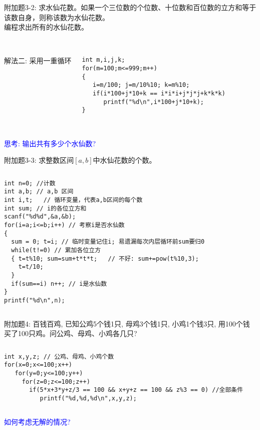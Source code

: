 \begin{frame}[fragile]
附加题3-2: 求水仙花数。如果一个三位数的个位数、十位数和百位数的立方和等于该数自身，则称该数为水仙花数。 \\
编程求出所有的水仙花数。\\
~\\ 
\pause
\begin{columns}
解法二: 采用一重循环
\begin{lstlisting}
int m,i,j,k; 
for(m=100;m<=999;m++)
{
   i=m/100; j=m/10%10; k=m%10;  
   if(i*100+j*10+k == i*i*i+j*j*j+k*k*k)  
      printf("%d\n",i*100+j*10+k);
}
\end{lstlisting}
\end{columns}
~\\
\textcolor{blue}{思考: 输出共有多少个水仙数?}
\end{frame}

\begin{frame}[fragile]
附加题3-3: 求整数区间$[a,b]$中水仙花数的个数。
\pause
\begin{columns}
\begin{lstlisting}
int n=0; //计数 
int a,b; // a,b 区间
int i,t;   // 循环变量，代表a,b区间的每个数
int sum; // i的各位立方和 
scanf("%d%d",&a,&b);
for(i=a;i<=b;i++) // 考察i是否水仙数
{  
  sum = 0; t=i; // 临时变量记住i; 易遗漏每次内层循环前sum要归0
  while(t!=0) // 累加各位立方 
  { t=t%10; sum=sum+t*t*t;   // 不好: sum+=pow(t%10,3);
    t=t/10; 
  }
  if(sum==i) n++; // i是水仙数 
}
printf("%d\n",n);
\end{lstlisting}
\end{columns}
\end{frame}

\begin{frame}[fragile]
附加题4: 百钱百鸡, 已知公鸡5个钱1只, 母鸡3个钱1只, 小鸡1个钱3只, 用100个钱买了100只鸡。问公鸡、母鸡、小鸡各几只? 
\vspace{0.5cm}
\pause
\begin{columns}
\begin{lstlisting}
int x,y,z; // 公鸡、母鸡、小鸡个数
for(x=0;x<=100;x++) 
   for(y=0;y<=100;y++) 
     for(z=0;z<=100;z++) 
       if(5*x+3*y+z/3 == 100 && x+y+z == 100 && z%3 == 0) //全部条件 
          printf("%d,%d,%d\n",x,y,z);
\end{lstlisting}
\end{columns}
\vspace{0.5cm}
\textcolor{blue}{如何考虑无解的情况?}
\end{frame}

